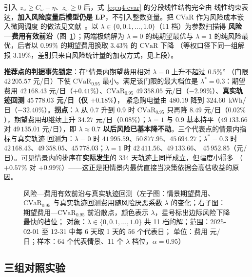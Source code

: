 引入 \(z_\omega\ge C_\omega-\eta\)、\(z_\omega\ge0\) 后，式~\eqref{eq:q4-cvar} 的分段线性结构完全由
线性约束表达，\textbf{加入风险度量后模型仍是 LP}，不引入整数变量。把 CVaR 作为风险成本嵌入微网调度
的做法见文献~\cite{refchenhan}。以 \(\lambda\in\{0,0.1,\dots,1.0\}\)（11 档）为参数扫描得
\textbf{风险—费用有效前沿}（图~\ref{fig:frontier}）；两端极端解为 \(\lambda=0\) 的纯期望最优与
\(\lambda=1\) 的纯风险最优，后者以 \(0.99\%\) 的期望费用换取 \(3.43\%\) 的 \(\mathrm{CVaR}\) 下降
（等权口径下同一组解报 \(3.19\%\)，差别只来自风险统计量的加权方式，见上段）。

\textbf{推荐点的判据事先锁定}：在“情景内期望费用相对 \(\lambda=0\) 上升不超过 \(0.5\%\)”
（门限 \(42\,205.57\) 元/日）下使 \(\mathrm{CVaR}_{0.95}\) 最小。满足该门限的最大档位是
\(\lambda^{*}=0.3\)：期望费用 \(42\,168.43\) 元/日（\(+0.41\%\)）、\(\mathrm{CVaR}_{0.95}\)
\(49\,358.05\) 元/日（\(-2.99\%\)）、\textbf{真实轨迹回测 \(45\,778.03\) 元/日（仅 \(+0.18\%\)）}，
紧急购电量由 \(480.19\) 降到 \(324.60\)~kWh/日（\(-32.40\%\)）。\textbf{拐点}：\(\lambda\) 从 0.7 升到
0.9 时 \(\mathrm{CVaR}_{0.95}\) 只再降 \(8.49\) 元/日（\(0.02\%\)），期望费用却继续上升
\(34.27\) 元/日（\(0.08\%\)）；\(\lambda=1\) 与 0.9 基本持平（\(49\,133.66\) 对 \(49\,135.01\)
元/日），即 \textbf{\(\lambda\approx0.7\) 以后风险已基本降不动}。三个代表点的情景内指标与真实轨迹
回测为：\(\lambda=0\) 时 \(41\,995.59\)、\(50\,877.95\)、\(45\,694.27\)；\(\lambda^{*}=0.3\) 时
\(42\,168.43\)、\(49\,358.05\)、\(45\,778.03\)；\(\lambda=1\) 时 \(42\,411.56\)、\(49\,133.66\)、
\(45\,952.85\)（元/日）。可见情景内的排序在\textbf{实际发生}的 334 天轨迹上同样成立，但幅度小得多
（\(+0.57\%\) 对 \(+0.99\%\)）——这正是把情景内最优直接当决策依据会高估收益的原因。

\begin{figure}[htbp]
  \centering
  \caption{风险—费用有效前沿与真实轨迹回测（左子图：情景期望费用、\(\mathrm{CVaR}_{0.95}\)
           与真实轨迹回测费用随风险厌恶系数 \(\lambda\) 的变化；右子图：期望费用—\(\mathrm{CVaR}_{0.95}\)
           前沿散点，颜色表示 \(\lambda\)，星号标出边际风险下降最快的档位；
           对象：\(\lambda\in\{0,0.1,\dots,1.0\}\) 共 11 档的解；范围：2025-02-01 至 12-31 中每 6 天取 1 天的 56 个代表日；
           单位：费用 元/日；样本：64 个代表情景、11 个 \(\lambda\) 档位，\(\alpha=0.95\)）}
  \label{fig:frontier}
\end{figure}

\subsection{三组对照实验}

